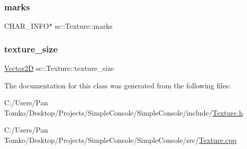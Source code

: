 \subsubsection{\texorpdfstring{marks}{marks}}
{\footnotesize\ttfamily C\+H\+A\+R\+\_\+\+I\+N\+FO$\ast$ sc\+::\+Texture\+::marks}

\mbox{\label{classsc_1_1_texture_abceb81354b704cd1a91a653449220349}} 
\subsubsection{\texorpdfstring{texture\_size}{texture\_size}}
{\footnotesize\ttfamily \mbox{\hyperlink{classsc_1_1_vector2_d}{Vector2D}} sc\+::\+Texture\+::texture\+\_\+size\hspace{0.3cm}{\ttfamily [private]}}



The documentation for this class was generated from the following files\+:\begin{DoxyCompactItemize}
\item 
C\+:/\+Users/\+Pan Tomko/\+Desktop/\+Projects/\+Simple\+Console/\+Simple\+Console/include/\mbox{\hyperlink{_texture_8h}{Texture.\+h}}\item 
C\+:/\+Users/\+Pan Tomko/\+Desktop/\+Projects/\+Simple\+Console/\+Simple\+Console/src/\mbox{\hyperlink{_texture_8cpp}{Texture.\+cpp}}\end{DoxyCompactItemize}
